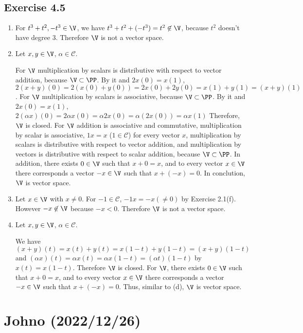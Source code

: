 \documentclass{article}
\theoremstyle{thmstyleone}
\theoremstyle{thmstyletwo}
\theoremstyle{thmstylethree}
\newcommand\C{\mathcal C}
\begin{document}
\subsection{Exercise 4.5}
\begin{enumerate}[label = (\alph*)]
\item
For $t^3+t^2,-t^3 \in\V$, we have $t^3+t^2+(-t^3) = t^2 \not\in\V$, because $t^2$ doesn't have degree $3$. Therefore $\V$ is not a vector space.
\item
Let $x,y \in\V$, $\alpha \in \C$.

For $\V$ multiplication by scalars is distributive with respect to vector addition, because $\V\subset\PP$.
By it and $2x(0) = x(1)$, $2(x+y)(0) = 2(x(0)+y(0)) = 2x(0) + 2y(0) = x(1) + y(1) = (x+y)(1)$.
For $\V$ multiplication by scalars is associative, because $\V\subset\PP$.
By it and $2x(0) = x(1)$, $2(\alpha x)(0) = 2\alpha x(0) = \alpha 2x(0) = \alpha (2x(0)) = \alpha x(1)$
Therefore, $\V$ is closed.
For $\V$ addition is associative and commutative, multiplication by scalar is associative, $1x = x$ ($1 \in\C$) for every vector $x$, multiplication by scalars is distributive with respect to vector addition, and multiplication by vectors is distributive with respect to scalar addition, because $\V\subset\PP$.
In addition, there exists $0 \in\V$ such that $x + 0 = x$, and to every vector $x \in\V$ there corresponds a vector $-x \in\V$ such that $x + (-x) = 0$.
In conclution, $\V$ is vector space.

\item
Let $x \in\V$ with $x \ne 0$.
For $-1 \in\C$, $-1x = -x (\ne 0)$ by Exercise 2.1(f). However $-x \not\in\V$ because $-x < 0$.
Therefore $\V$ is not a vector space.
\item
Let $x,y \in\V$, $\alpha \in\C$.

We have $(x+y)(t) = x(t) + y(t) = x(1-t) + y(1-t) = (x+y)(1-t)$ and $(\alpha x)(t) = \alpha x(t) = \alpha x(1-t) = (\alpha t)(1-t)$ by $x(t) = x(1-t)$.
Therefore $\V$ is closed.
For $\V$, there exists $0 \in\V$ such that $x + 0 = x$, and to every vector $x \in\V$ there corresponds a vector $-x \in\V$ such that $x + (-x) = 0$.
Thus, similar to (d), $\V$ is vector space.
\end{enumerate}
\let\V\undefined
\let\PP\undefined

\section{Johno (2022/12/26)}
\end{document}
